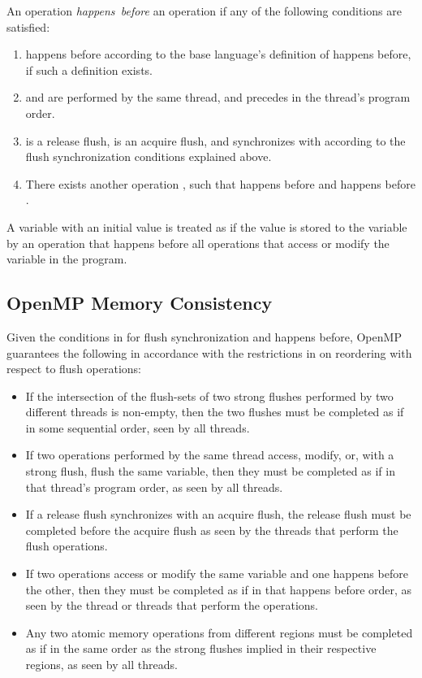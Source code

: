 An operation  \emph{happens~before} an operation  if any of the following conditions are satisfied:
\begin{enumerate}
\item {} happens before  according to the base language's definition of happens before, if such a definition exists.
\item {} and  are performed by the same thread, and  precedes  in the thread's program order.
\item {} is a release flush,  is an acquire flush, and  synchronizes with  according to the flush synchronization
conditions explained above.
\item There exists another operation , such that  happens before  and  happens before .
\end{enumerate}

A variable with an initial value is treated as if the value is stored to the
variable by an operation that happens before all operations that access or
modify the variable in the program.

\subsection{OpenMP Memory Consistency}
\label{subsec:OpenMP Memory Consistency}
Given the conditions in  for flush
synchronization and happens before, OpenMP guarantees the following in
accordance with the restrictions in  on
reordering with respect to flush operations:

\begin{itemize}
\item If the intersection of the flush-sets of two strong flushes
    performed by two different threads is non-empty, then the two flushes must
    be completed as if in some sequential order, seen by all threads.

\item If two operations performed by the same thread access, modify, or, with
    a strong flush, flush the same variable, then they must be
    completed as if in that thread's program order, as seen by all threads. 

\item If a release flush synchronizes with an acquire flush, the release flush
    must be completed before the acquire flush as seen by the threads that
    perform the flush operations.

\item If two operations access or modify the same variable and one happens
    before the other, then they must be completed as if in that happens before
    order, as seen by the thread or threads that perform the operations.

\item Any two atomic memory operations from different  regions
    must be completed as if in the same order as the strong flushes
    implied in their respective regions, as seen by all threads.
    \end{itemize}

